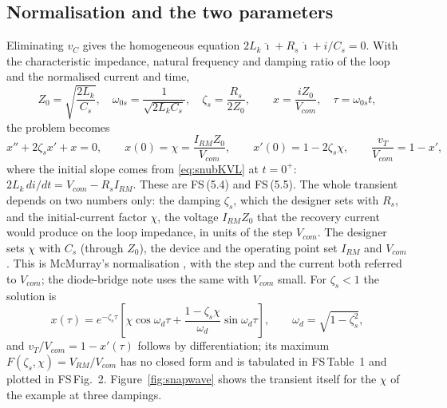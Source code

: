 \documentclass[10pt,a4paper]{scrartcl}
\newcommand{\Lk}{L_{k}}
\newcommand{\fs}[1]{\textsf{FS}\,(#1)}
\newcommand{\fstab}[1]{\textsf{FS}\,Table~#1}
\newcommand{\fsfig}[1]{\textsf{FS}\,Fig.~#1}
\begin{document}
\subsection{Normalisation and the two parameters}
Eliminating $v_C$ gives the homogeneous equation $2\Lk\,\ddot\imath + R_s\,\dot\imath + i/C_s = 0$. With the characteristic impedance, natural frequency and damping ratio of the loop and the normalised current and time,
\begin{equation}
Z_0 = \sqrt{\frac{2\Lk}{C_s}}, \quad \omega_{0s} = \frac{1}{\sqrt{2\Lk C_s}}, \quad \zeta_s = \frac{R_s}{2Z_0}, \qquad
x = \frac{iZ_0}{V_{com}}, \quad \tau = \omega_{0s}t ,
\label{eq:norm}
\end{equation}
the problem becomes
\begin{equation}
x'' + 2\zeta_sx' + x = 0, \qquad x(0) = \chi = \frac{I_{RM}Z_0}{V_{com}}, \qquad x'(0) = 1 - 2\zeta_s\chi, \qquad \frac{v_T}{V_{com}} = 1 - x' ,
\label{eq:normode}
\end{equation}
where the initial slope comes from \eqref{eq:snubKVL} at $t = 0^+$: $2\Lk\,di/dt = V_{com} - R_sI_{RM}$. These are \fs{5.4} and \fs{5.5}. The whole transient depends on two numbers only: the damping $\zeta_s$, which the designer sets with $R_s$, and the initial-current factor $\chi$, the voltage $I_{RM}Z_0$ that the recovery current would produce on the loop impedance, in units of the step $V_{com}$. The designer sets $\chi$ with $C_s$ (through $Z_0$), the device and the operating point set $I_{RM}$ and $V_{com}$. This is McMurray's normalisation \cite{mcmurray}, with the step and the current both referred to $V_{com}$; the diode-bridge note \cite{bagnara_snub} uses the same with $V_{com}$ small. For $\zeta_s<1$ the solution is
\begin{equation}
x(\tau) = e^{-\zeta_s\tau}\left[\chi\cos\omega_d\tau + \frac{1-\zeta_s\chi}{\omega_d}\sin\omega_d\tau\right], \qquad \omega_d = \sqrt{1-\zeta_s^2} ,
\label{eq:xsol}
\end{equation}
and $v_T/V_{com} = 1 - x'(\tau)$ follows by differentiation; its maximum $F(\zeta_s,\chi) = V_{RM}/V_{com}$ has no closed form and is tabulated in \fstab{1} and plotted in \fsfig{2}. Figure~\ref{fig:snapwave} shows the transient itself for the $\chi$ of the example at three dampings.
\end{document}

